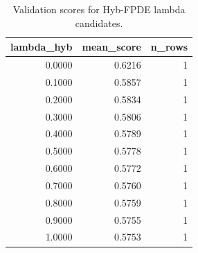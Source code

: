 \begin{table}[t]
\caption{Validation scores for Hyb-FPDE lambda candidates.}
\label{tab:lambda_distribution_computed}
\centering
\begin{tabular}{rrr}
\toprule
lambda\_hyb & mean\_score & n\_rows \\
\midrule
0.0000 & 0.6216 & 1 \\
0.1000 & 0.5857 & 1 \\
0.2000 & 0.5834 & 1 \\
0.3000 & 0.5806 & 1 \\
0.4000 & 0.5789 & 1 \\
0.5000 & 0.5778 & 1 \\
0.6000 & 0.5772 & 1 \\
0.7000 & 0.5760 & 1 \\
0.8000 & 0.5759 & 1 \\
0.9000 & 0.5755 & 1 \\
1.0000 & 0.5753 & 1 \\
\bottomrule
\end{tabular}

\end{table}
